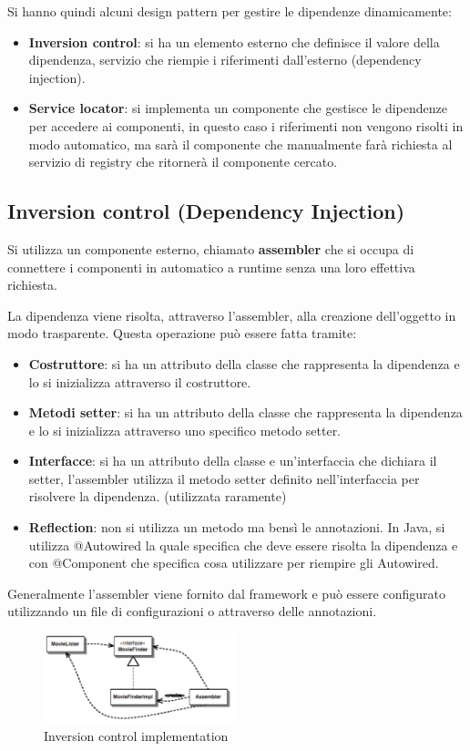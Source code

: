 Si hanno quindi alcuni design pattern per gestire le dipendenze dinamicamente:
\begin{itemize}
      \item \textbf{Inversion control}: si ha un elemento esterno che definisce
            il valore della dipendenza, servizio che riempie i riferimenti
            dall'esterno (dependency injection).
      \item \textbf{Service locator}: si implementa un componente che gestisce
            le dipendenze per accedere ai componenti, in questo caso i riferimenti
            non vengono risolti in modo automatico, ma sarà il componente che
            manualmente farà richiesta al servizio di registry che ritornerà il
            componente cercato.
\end{itemize}
\subsection{Inversion control (Dependency Injection)}
Si utilizza un componente esterno, chiamato \textbf{assembler} che si occupa di
connettere i componenti in automatico a runtime senza una loro effettiva richiesta.

La dipendenza viene risolta, attraverso l'assembler, alla creazione dell'oggetto
in modo trasparente. Questa operazione può essere fatta tramite:
\begin{itemize}
      \item \textbf{Costruttore}: si ha un attributo della classe che rappresenta
            la dipendenza e lo si inizializza attraverso il costruttore.
      \item \textbf{Metodi setter}: si ha un attributo della classe che rappresenta
            la dipendenza e lo si inizializza attraverso uno specifico metodo
            setter.
      \item \textbf{Interfacce}: si ha un attributo della classe e un'interfaccia
            che dichiara il setter, l'assembler utilizza il metodo setter definito
            nell'interfaccia per risolvere la dipendenza. (utilizzata raramente)
      \item \textbf{Reflection}: non si utilizza un metodo ma bensì le annotazioni.
            In Java, si utilizza @Autowired la quale specifica che deve essere
            risolta la dipendenza e con @Component che specifica cosa utilizzare
            per riempire gli Autowired.
\end{itemize}
Generalmente l'assembler viene fornito dal framework e può essere configurato
utilizzando un file di configurazioni o attraverso delle annotazioni.
\begin{figure}[!ht]
      \centering
      \includegraphics[width=0.5\textwidth]{img/mvc/inversion-control.png}
      \caption{Inversion control implementation}
\end{figure}

